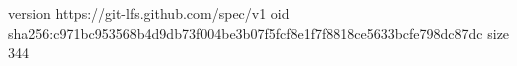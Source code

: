 version https://git-lfs.github.com/spec/v1
oid sha256:c971bc953568b4d9db73f004be3b07f5fcf8e1f7f8818ce5633bcfe798dc87dc
size 344
